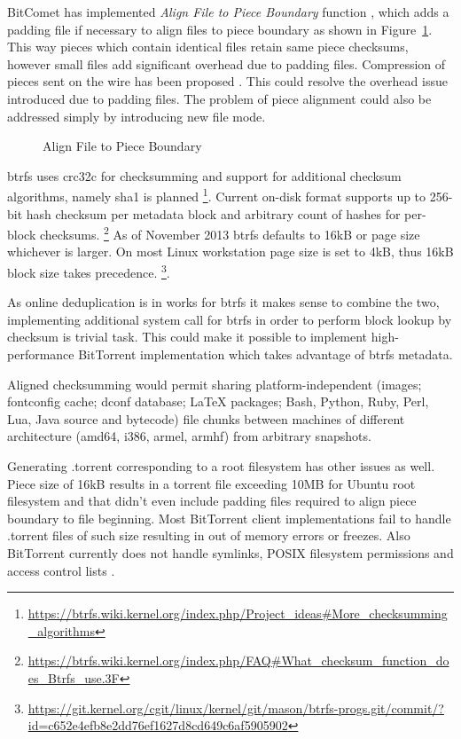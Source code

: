 \documentclass[a4paper,11pt]{kth-mag}
\begin{document}
BitComet has implemented \emph{Align File to Piece Boundary} function
\cite{bitcomet-align-to-piece},
which adds a padding file if necessary to align files to piece boundary
as shown in Figure~\ref{fig:torrent-multifile-aligned}.
This way pieces which contain identical files retain same piece checksums,
however small files add significant overhead due to padding files.
Compression of pieces sent on the wire has been proposed
\cite{bittorrent-wishlist}.
This could resolve the overhead issue introduced due to padding files.
The problem of piece alignment could also be addressed
simply by introducing new file mode.

\begin{figure}[!htb]
\centering
\scalebox{0.35}{}
\caption{Align File to Piece Boundary}
\label{fig:torrent-multifile-aligned}
\end{figure}


\acrshort{btrfs} uses \acrshort{crc32c} for checksumming and support for additional
checksum algorithms, namely \acrshort{sha1} is planned
\footnote{\url{https://btrfs.wiki.kernel.org/index.php/Project_ideas\#More_checksumming_algorithms}}.
Current on-disk format supports up to 256-bit hash checksum per
metadata block and arbitrary count of hashes for per-block checksums.
\footnote{\url{https://btrfs.wiki.kernel.org/index.php/FAQ\#What_checksum_function_does_Btrfs_use.3F}}
As of November 2013 \acrshort{btrfs} defaults to 16kB or page size
whichever is larger.
On most Linux workstation page size is set to 4kB, thus 16kB block
size takes precedence.
\footnote{\url{https://git.kernel.org/cgit/linux/kernel/git/mason/btrfs-progs.git/commit/?id=c652e4efb8e2dd76ef1627d8cd649c6af5905902}}.

As online deduplication is in works for \acrshort{btrfs} it makes sense to
combine the two, implementing additional system call for \acrshort{btrfs} in
order to perform block lookup by checksum is trivial task.
This could make it possible to implement high-performance
BitTorrent implementation which takes advantage of \acrshort{btrfs} metadata.

Aligned checksumming would permit sharing platform-independent
(images; fontconfig cache; dconf database; LaTeX packages;
Bash, Python, Ruby, Perl, Lua, Java source and bytecode)
file chunks between machines of different architecture (amd64, i386, armel, armhf)
from arbitrary snapshots.

Generating .torrent corresponding to a root filesystem
has other issues as well.
Piece size of 16kB results in a torrent file
exceeding 10MB for Ubuntu root filesystem and that didn't even
include padding files required to align piece boundary to file beginning.
Most BitTorrent client implementations fail to handle .torrent
files of such size resulting in out of memory errors or freezes.
Also BitTorrent currently does not handle symlinks,
POSIX filesystem permissions and access control lists
\cite{posix-acl}.
\end{document}
